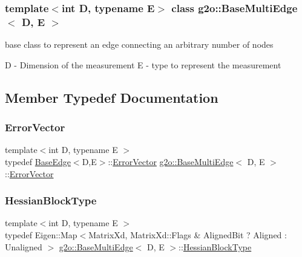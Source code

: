 \subsubsection*{template$<$int D, typename E$>$\newline
class g2o\+::\+Base\+Multi\+Edge$<$ D, E $>$}

base class to represent an edge connecting an arbitrary number of nodes 

D -\/ Dimension of the measurement E -\/ type to represent the measurement 

\subsection{Member Typedef Documentation}
\mbox{\label{classg2o_1_1_base_multi_edge_ae17c6b5747bfed295214942207a6eb74}} 
\subsubsection{\texorpdfstring{Error\+Vector}{ErrorVector}}
{\footnotesize\ttfamily template$<$int D, typename E $>$ \\
typedef \mbox{\hyperlink{classg2o_1_1_base_edge}{Base\+Edge}}$<$D,E$>$\+::\mbox{\hyperlink{classg2o_1_1_base_edge_af5b558dd24e4be2e437563cae4b3550d}{Error\+Vector}} \mbox{\hyperlink{classg2o_1_1_base_multi_edge}{g2o\+::\+Base\+Multi\+Edge}}$<$ D, E $>$\+::\mbox{\hyperlink{classg2o_1_1_base_edge_af5b558dd24e4be2e437563cae4b3550d}{Error\+Vector}}}

\mbox{\label{classg2o_1_1_base_multi_edge_af299cc8f77d917c1ad4a7d8004aec3a1}} 
\subsubsection{\texorpdfstring{Hessian\+Block\+Type}{HessianBlockType}}
{\footnotesize\ttfamily template$<$int D, typename E $>$ \\
typedef Eigen\+::\+Map$<$Matrix\+Xd, Matrix\+Xd\+::\+Flags \& Aligned\+Bit ? Aligned \+: Unaligned $>$ \mbox{\hyperlink{classg2o_1_1_base_multi_edge}{g2o\+::\+Base\+Multi\+Edge}}$<$ D, E $>$\+::\mbox{\hyperlink{classg2o_1_1_base_multi_edge_af299cc8f77d917c1ad4a7d8004aec3a1}{Hessian\+Block\+Type}}}

